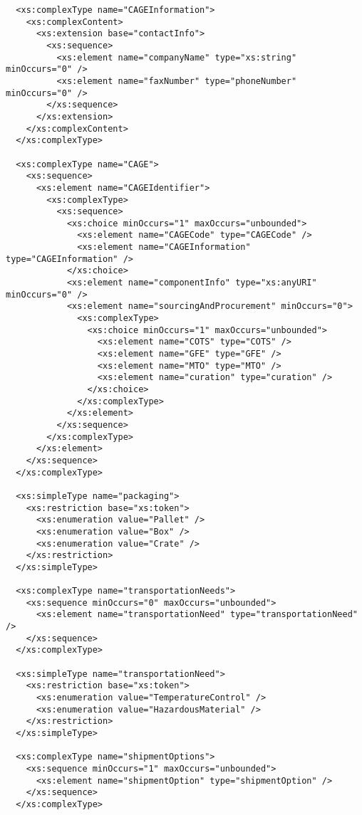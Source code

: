 \begin{lstlisting}
  <xs:complexType name="CAGEInformation">
    <xs:complexContent>
      <xs:extension base="contactInfo">
        <xs:sequence>
          <xs:element name="companyName" type="xs:string" minOccurs="0" />
          <xs:element name="faxNumber" type="phoneNumber" minOccurs="0" />
        </xs:sequence>
      </xs:extension>
    </xs:complexContent>
  </xs:complexType>

  <xs:complexType name="CAGE">
    <xs:sequence>
      <xs:element name="CAGEIdentifier">
        <xs:complexType>
          <xs:sequence>
            <xs:choice minOccurs="1" maxOccurs="unbounded">
              <xs:element name="CAGECode" type="CAGECode" />
              <xs:element name="CAGEInformation" type="CAGEInformation" />
            </xs:choice>
            <xs:element name="componentInfo" type="xs:anyURI" minOccurs="0" />
            <xs:element name="sourcingAndProcurement" minOccurs="0">
              <xs:complexType>
                <xs:choice minOccurs="1" maxOccurs="unbounded">
                  <xs:element name="COTS" type="COTS" />
                  <xs:element name="GFE" type="GFE" />
                  <xs:element name="MTO" type="MTO" />
                  <xs:element name="curation" type="curation" />
                </xs:choice>
              </xs:complexType>
            </xs:element>
          </xs:sequence>
        </xs:complexType>
      </xs:element>
    </xs:sequence>
  </xs:complexType>

  <xs:simpleType name="packaging">
    <xs:restriction base="xs:token">
      <xs:enumeration value="Pallet" />
      <xs:enumeration value="Box" />
      <xs:enumeration value="Crate" />
    </xs:restriction>
  </xs:simpleType>

  <xs:complexType name="transportationNeeds">
    <xs:sequence minOccurs="0" maxOccurs="unbounded">
      <xs:element name="transportationNeed" type="transportationNeed" />
    </xs:sequence>
  </xs:complexType>

  <xs:simpleType name="transportationNeed">
    <xs:restriction base="xs:token">
      <xs:enumeration value="TemperatureControl" />
      <xs:enumeration value="HazardousMaterial" />
    </xs:restriction>
  </xs:simpleType>

  <xs:complexType name="shipmentOptions">
    <xs:sequence minOccurs="1" maxOccurs="unbounded">
      <xs:element name="shipmentOption" type="shipmentOption" />
    </xs:sequence>
  </xs:complexType>


\end{lstlisting}
